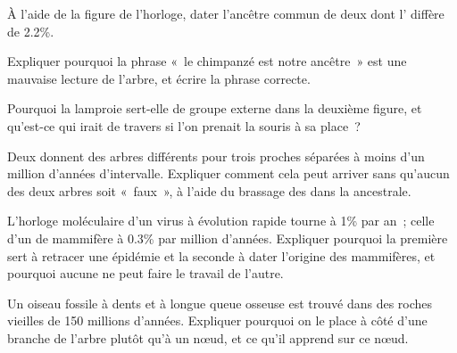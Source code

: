 \begin{exercise}[$\star\star$]\label{exo:g12:phylogenetic-trees:9}
À l'aide de la figure de l'horloge, dater l'ancêtre commun de deux
 dont l' diffère de 2.2\%.
\end{exercise}

\begin{exercise}[$\star\star$]\label{exo:g12:phylogenetic-trees:10}
Expliquer pourquoi la phrase «~le chimpanzé est notre ancêtre~» est
une mauvaise lecture de l'arbre, et écrire la phrase correcte.
\end{exercise}

\begin{exercise}[$\star\star$]\label{exo:g12:phylogenetic-trees:11}
Pourquoi la lamproie sert-elle de groupe externe dans la deuxième
figure, et qu'est-ce qui irait de travers si l'on prenait la souris à
sa place~?
\end{exercise}

\begin{exercise}[$\star\star\star$]\label{exo:g12:phylogenetic-trees:12}
Deux  donnent des arbres différents pour trois  proches
séparées à moins d'un million d'années d'intervalle. Expliquer comment
cela peut arriver sans qu'aucun des deux arbres soit «~faux~», à
l'aide du brassage des  dans la  ancestrale.
\end{exercise}

\begin{exercise}[$\star\star\star$]\label{exo:g12:phylogenetic-trees:13}
L'horloge moléculaire d'un virus à évolution rapide tourne à 1\% par
an~; celle d'un  de mammifère à 0.3\% par million d'années.
Expliquer pourquoi la première sert à retracer une épidémie et la
seconde à dater l'origine des mammifères, et pourquoi aucune ne peut
faire le travail de l'autre.
\end{exercise}

\begin{exercise}[$\star\star\star$]\label{exo:g12:phylogenetic-trees:14}
Un oiseau fossile à dents et à longue queue osseuse est trouvé dans
des roches vieilles de 150 millions d'années. Expliquer pourquoi on le
place à côté d'une branche de l'arbre plutôt qu'à un nœud, et ce qu'il
apprend sur ce nœud.
\end{exercise}

